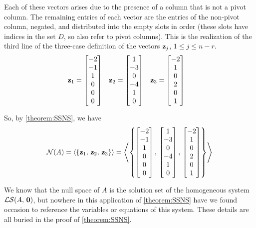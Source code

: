 \documentclass{ximera}
\begin{document}
\begin{example}
  Each of these vectors arises due to the presence of a column that is
  not a pivot column.  The remaining entries of each vector are the
  entries of the non-pivot column, negated, and distributed into the
  empty slots in order (these slots have indices in the set $D$, so
  also refer to pivot columns).  This is the realization of the third
  line of the three-case definition of the vectors $\mathbf{z}_j$,
  $1\leq j\leq n-r$.
  \begin{align*}
    \mathbf{z}_1&=\begin{bmatrix}-2\\ -1\\ 1\\  0 \\0 \\ 0\end{bmatrix}
              &
                \mathbf{z}_2&=\begin{bmatrix}1\\ -3\\ 0\\ -4\\ 1\\ 0\end{bmatrix}
              &
                \mathbf{z}_3&=\begin{bmatrix}-2\\ 1\\ 0\\ 2\\ 0\\ 1\end{bmatrix}
  \end{align*}

  So, by \ref{theorem:SSNS}, we have
  \[
    \mathcal{N}\!\left(A\right)
    =
    \left\langle\left\{\mathbf{z}_1,\,\mathbf{z}_2,\,\mathbf{z}_3\right\}\right\rangle
    =
    \left\langle\left\{
        \begin{bmatrix}-2\\ -1\\ 1\\  0 \\0 \\ 0\end{bmatrix},\,
        \begin{bmatrix}1\\ -3\\ 0\\ -4\\ 1\\ 0\end{bmatrix},\,
        \begin{bmatrix}-2\\ 1\\ 0\\ 2\\ 0\\ 1\end{bmatrix}
      \right\}\right\rangle
  \]

  We know that the null space of $A$ is the solution set of the
  homogeneous system $\mathcal{LS}\!\left(A,\,\mathbf{0}\right)$, but nowhere in this application
  of \ref{theorem:SSNS} have we found occasion to reference the
  variables or equations of this system.  These details are all buried
  in the proof of \ref{theorem:SSNS}.
\end{example}
\end{document}
